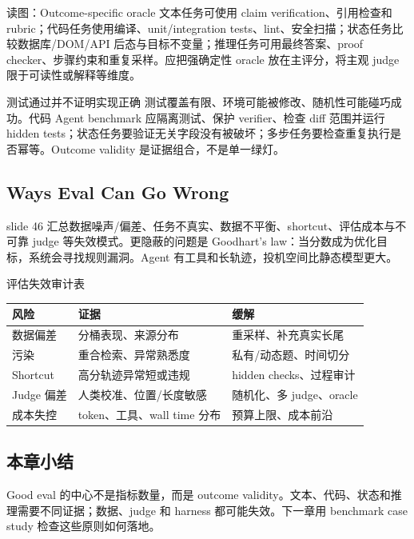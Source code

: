 \begin{knowledgebox}{读图：Outcome-specific oracle}
文本任务可使用 claim verification、引用检查和 rubric；代码任务使用编译、unit/integration tests、lint、安全扫描；状态任务比较数据库/DOM/API 后态与目标不变量；推理任务可用最终答案、proof checker、步骤约束和重复采样。应把强确定性 oracle 放在主评分，将主观 judge 限于可读性或解释等维度。
\end{knowledgebox}

\begin{warningbox}{测试通过并不证明实现正确}
测试覆盖有限、环境可能被修改、随机性可能碰巧成功。代码 Agent benchmark 应隔离测试、保护 verifier、检查 diff 范围并运行 hidden tests；状态任务要验证无关字段没有被破坏；多步任务要检查重复执行是否幂等。Outcome validity 是证据组合，不是单一绿灯。
\end{warningbox}

\subsection{Ways Eval Can Go Wrong}

slide 46 汇总数据噪声/偏差、任务不真实、数据不平衡、shortcut、评估成本与不可靠 judge 等失效模式。更隐蔽的问题是 Goodhart's law：当分数成为优化目标，系统会寻找规则漏洞。Agent 有工具和长轨迹，投机空间比静态模型更大。


\begin{knowledgebox}{评估失效审计表}
\begin{longtable}{p{2.8cm}p{4.2cm}p{4.2cm}}
\toprule
\textbf{风险} & \textbf{证据} & \textbf{缓解} \\
\midrule
数据偏差 & 分桶表现、来源分布 & 重采样、补充真实长尾 \\
污染 & 重合检索、异常熟悉度 & 私有/动态题、时间切分 \\
Shortcut & 高分轨迹异常短或违规 & hidden checks、过程审计 \\
Judge 偏差 & 人类校准、位置/长度敏感 & 随机化、多 judge、oracle \\
成本失控 & token、工具、wall time 分布 & 预算上限、成本前沿 \\
\bottomrule
\end{longtable}
\end{knowledgebox}

\subsection{本章小结}

Good eval 的中心不是指标数量，而是 outcome validity。文本、代码、状态和推理需要不同证据；数据、judge 和 harness 都可能失效。下一章用 benchmark case study 检查这些原则如何落地。

